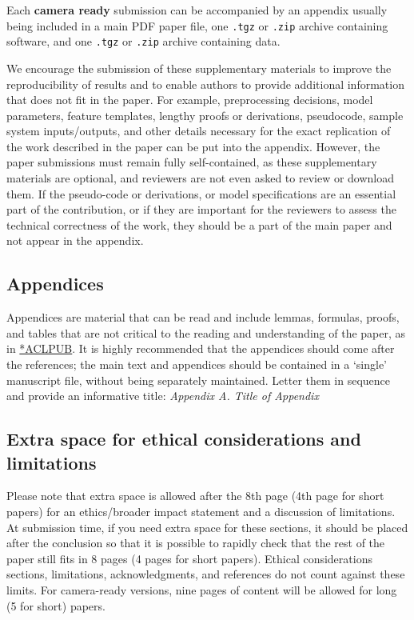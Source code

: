 \documentclass[10pt, a4paper]{article}
\begin{document}
Each \textbf{camera ready} submission can be accompanied by an appendix usually being included in a main PDF paper file, one \texttt{.tgz} or \texttt{.zip} archive containing software, and one \texttt{.tgz} or \texttt{.zip} archive containing data.

We encourage the submission of these supplementary materials to improve the reproducibility of results and to enable authors to provide additional information that does not fit in the paper. For example, preprocessing decisions, model parameters, feature templates, lengthy proofs or derivations, pseudocode, sample system inputs/outputs, and other details necessary for the exact replication of the work described in the paper can be put into the appendix. However, the paper submissions must remain fully self-contained, as these supplementary materials are optional, and reviewers are not even asked to review or download them. If the pseudo-code or derivations, or model specifications are an essential part of the contribution, or if they are important for the reviewers to assess the technical correctness of the work, they should be a part of the main paper and not appear in the appendix.

\subsection{Appendices}

Appendices are material that can be read and include lemmas, formulas, proofs, and tables that are not critical to the reading and understanding of the paper, as in \href{https://acl-org.github.io/ACLPUB/formatting.html#appendices}{*ACLPUB}. It is  highly recommended that the appendices should come after the references; the main text and appendices should be contained in a `single' manuscript file, without being separately maintained. Letter them in sequence and provide an informative title: \textit{Appendix A. Title of Appendix}


\subsection{Extra space for ethical considerations and limitations}

Please note that extra space is allowed after the 8th page (4th page for short papers) for an ethics/broader impact statement and a discussion of limitations. At submission time, if you need extra space for these sections, it should be placed after the conclusion so that it is possible to rapidly check that the rest of the paper still fits in 8 pages (4 pages for short papers). Ethical considerations sections, limitations, acknowledgments, and references do not count against these limits. For camera-ready versions, nine pages of content will be allowed for long (5 for short)
papers.
\end{document}
